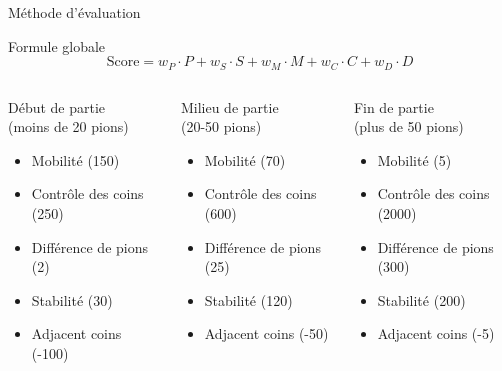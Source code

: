 \begin{frame}[t]{Méthode d'évaluation}
    \begin{block}{Formule globale}
        \[
        \text{Score} = w_P \cdot P + w_S \cdot S + w_M \cdot M + w_C \cdot C + w_D \cdot D
        \]
    \end{block}
    
    \begin{columns}[onlytextwidth,T]
        \begin{block}{\footnotesize Début de partie\\ (moins de 20 pions)}
            \scriptsize
            \setlength{\leftmargini}{0pt}
            \begin{itemize}
                \item[] Mobilité (150)
                \item[] Contrôle des coins (250) 
                \item[] Différence de pions (2)
                \item[] Stabilité (30)
                \item[] Adjacent coins (-100)
            \end{itemize}
        \end{block}
        
        \begin{block}{\footnotesize Milieu de partie\\ (20-50 pions)}
            \scriptsize
            \setlength{\leftmargini}{0pt}
            \begin{itemize}
                \item[] Mobilité (70)
                \item[] Contrôle des coins (600) 
                \item[] Différence de pions (25)
                \item[] Stabilité (120)
                \item[] Adjacent coins (-50)
            \end{itemize}
        \end{block}
        
        \begin{block}{\footnotesize Fin de partie\\ (plus de 50 pions)}
            \scriptsize
            \setlength{\leftmargini}{0pt}
            \begin{itemize}
                \item[] Mobilité (5)
                \item[] Contrôle des coins (2000) 
                \item[] Différence de pions (300)
                \item[] Stabilité (200)
                \item[] Adjacent coins (-5)
            \end{itemize}
        \end{block}
    \end{columns}
    

\end{frame}
